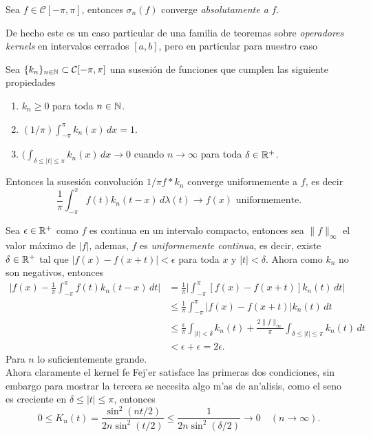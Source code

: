 \documentclass[main.tex]{subfiles}
\begin{document}
    \begin{teorema}
      Sea \(f\in\mathcal{C}[-\pi,\pi]\), entonces \(\sigma_n(f)\) converge \emph{absolutamente a} \(f\).
    \end{teorema}
    De hecho este es un caso particular de una familia de teoremas sobre \emph{operadores kernels} en intervalos cerrados \([a,b]\), pero en particular para nuestro caso
    \begin{teorema}
      Sea \(\{k_n\}_{n\in \mathbb N }\subset\mathcal{C}[-\pi,\pi]\) una susesión de funciones que cumplen las siguiente propiedades
      \begin{enumerate}
        \item \(k_n\geq 0\) para toda \(n\in \mathbb N \).
        \item \((1/\pi)\int_{-\pi}^{\pi}k_n(x)\,dx=1\).
        \item \((\int_{\delta\leq|t|\leq\pi}k_n(x)\,dx\to0\) cuando \(n\to\infty\) para toda \(\delta\in\mathbb R ^+\).
      \end{enumerate}
      Entonces la  susesión convolución \(1/\pi f*k_n\) converge uniformemente a \(f\), es decir
      \[
      \frac{1}{\pi}\int_{-\pi}^{\pi} f(t)k_{n}(t-x)\,d\lambda(t)\to f(x)\text{ uniformemente.}
      \]
    \end{teorema}
    \dem Sea \(\epsilon\in\mathbb R ^+\) como \(f\) es continua en un intervalo compacto, entonces sea \(\|f\|_{\infty}\) el valor máximo de \(|f|\), ademas, \(f\) es \emph{uniformemente continua}, es decir, existe \(\delta\in\mathbb R ^+\) tal que \(|f(x)-f(x+t)|<\epsilon\) para toda \(x\) y \(|t|<\delta\). Ahora como \(k_n\) no son negativos, entonces
    \begin{align*}
      \bigg|f(x)-\frac{1}{\pi}\int_{-\pi}^{\pi} f(t)k_{n}(t-x)\,dt\bigg|&=
      \frac{1}{\pi}\bigg|\int_{-\pi}^{\pi} [f(x)-f(x+t)]k_{n}(t)\,dt\bigg|\\
      &\leq\frac{1}{\pi}\int_{-\pi}^{\pi} |f(x)-f(x+t)|k_{n}(t)\,dt\\
      &\leq\frac{\epsilon}{\pi}\int_{|t|<\delta}k_n(t)+ \frac{2\|f\|_{\infty}}{\pi}\int_{\delta\leq|t|\leq\pi}k_{n}(t)\,dt\\
      & < \epsilon+\epsilon=2\epsilon.
      \end{align*}
      Para \(n\) lo suficientemente grande.
      \QED\\
      Ahora claramente el kernel fe Fej'er satisface las primeras dos condiciones, sin embargo para mostrar la tercera se necesita algo m'as de an'alisis, como el seno  es creciente en \(\delta\leq|t|\leq\pi\), entonces
      \[
        0\leq K_{n}(t)=\frac{\sin^{2}(nt/2)}{2n\sin^{2}(t/2)}\leq\frac{1}{2n\sin^{2}(\delta/2)}\to0\quad(n\to\infty).
      \]

  
\end{document}
